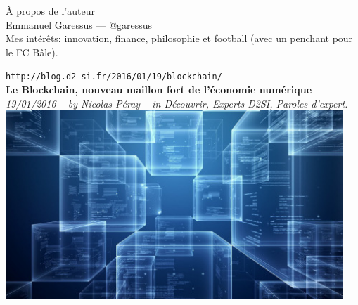 \documentclass[11pt,twoside,a4paper]{article}
\begin{document}
{\`A} propos de l'auteur ~\\
Emmanuel Garessus --- @garessus ~\\
Mes int{\'e}r{\^e}ts: innovation, finance, philosophie et football (avec un penchant pour le FC B{\^a}le). ~\\



\clearpage

\texttt{\small http://blog.d2-si.fr/2016/01/19/blockchain/}~\\

\textbf{\Large Le Blockchain, nouveau maillon fort de l'{\'e}conomie num{\'e}rique}~\\
\emph{19/01/2016 -- by Nicolas P{\'e}ray -- in D{\'e}couvrir, Experts D2SI, Paroles d'expert. }~\\

\includegraphics[width=0.95\textwidth]{img/d2si_blog_image_blockchain.jpg}~\\
\end{document}

